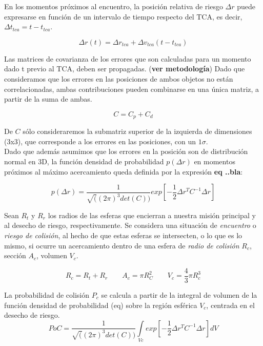 En los momentos pr\'oximos al encuentro, la posici\'on relativa de riesgo $\Delta r$ puede expresarse en funci\'on de un intervalo de tiempo respecto del TCA, es decir, $\Delta t_{tca}=t-t_{tca}$.

\begin{equation}
 \Delta r(t)=\Delta r_{tca}+\Delta v_{tca}(t-t_{tca})
\end{equation}

Las matrices de covarianza de los errores que son calculadas para un momento dado t previo al TCA, deben ser propagadas. ({\bf{ver metodolog\'ia}})
Dado que consideramos que los errores en las posiciones de ambos objetos no est\'an correlacionadas, ambas contribuciones pueden combinarse en una \'unica matriz, a partir de la suma de ambas.

\begin{equation}
 C=C_{p}+C_{d}
\end{equation}

De $C$ s\'olo consideraremos la submatriz superior de la izquierda de dimensiones (3x3), que corresponde a los errores en las posiciones, con un $1 \sigma$.\\
Dado que adem\'as asumimos que los errores en la posici\'on son de distribuci\'on normal en 3D, la funci\'on densidad de probabilidad $p(\Delta r)$ en momentos pr\'oximos al m\'aximo acercamiento queda definida por la expresi\'on {\bf{eq ..bla}}:

\begin{equation}
 p(\Delta r)=\frac{1}{\sqrt((2 \pi)^3det(C))} exp[-\frac{1}{2}\Delta r^TC^{-1}\Delta r] 
\end{equation}



Sean $R_{t}$ y $R_{r}$ los radios de las esferas que encierran a nuestra misi\'on principal y al desecho de riesgo, respectivamente. Se considera una situaci\'on de {\it{encuentro}} o {\it{riesgo de colisi\'on}}, al hecho de que estas esferas se intersecten, o lo que es lo mismo, si ocurre un acercamiento dentro de una esfera de {\it{radio de colisi\'on}} $R_{c}$, secci\'on $A_{c}$,  volumen $V_{c}$.

\begin{equation}
R_{c}=R_{t}+R_{r} \qquad A_{c}=\pi R_{C}^{2} \qquad V_{c}=\frac{4}{3} \pi R_{c}^{3}
\end{equation}

La probabilidad de colisi\'on $P_{c}$ se calcula a partir de la integral de volumen de la funci\'on densidad de probabilidad (eq) sobre la regi\'on esf\'erica $V_{c}$, centrada en el desecho de riesgo.
\begin{equation}
PoC=\frac{1}{\sqrt((2\pi)^3det(C))} \int \limits_{Vc} exp[-\frac{1}{2}\Delta r^TC^{-1}\Delta r]dV
\label{eq:poc3d}
\end{equation}

